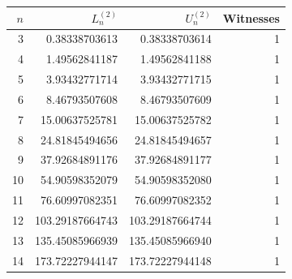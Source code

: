 \begin{tabular}{rrrr}\toprule
$n$ & $L_n^{(2)}$ & $U_n^{(2)}$ & Witnesses\\\midrule
3 & 0.38338703613 & 0.38338703614 & 1 \\
4 & 1.49562841187 & 1.49562841188 & 1 \\
5 & 3.93432771714 & 3.93432771715 & 1 \\
6 & 8.46793507608 & 8.46793507609 & 1 \\
7 & 15.00637525781 & 15.00637525782 & 1 \\
8 & 24.81845494656 & 24.81845494657 & 1 \\
9 & 37.92684891176 & 37.92684891177 & 1 \\
10 & 54.90598352079 & 54.90598352080 & 1 \\
11 & 76.60997082351 & 76.60997082352 & 1 \\
12 & 103.29187664743 & 103.29187664744 & 1 \\
13 & 135.45085966939 & 135.45085966940 & 1 \\
14 & 173.72227944147 & 173.72227944148 & 1 \\
\bottomrule\end{tabular}
